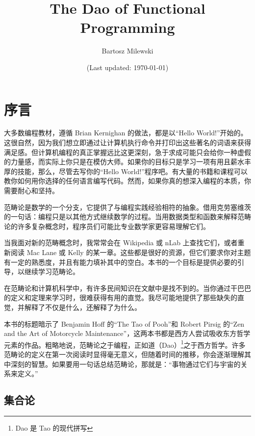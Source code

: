 \documentclass[11pt, book]{memoir}
\begin{document}
  \setcounter{tocdepth}{4}
  \setcounter{secnumdepth}{4}
  \frontmatter

  \title{\huge The Dao of Functional Programming}
  \author{\Large Bartosz Milewski }

  \date{\vfill (Last updated: \today)}

  \maketitle

  \tableofcontents

  \clearpage

  \section{序言}

  大多数编程教材，遵循 Brian Kernighan 的做法，都是以``Hello World!''开始的。这很自然，因为我们想立即通过让计算机执行命令并打印出这些著名的词语来获得满足感。但计算机编程的真正掌握远比这更深刻，急于求成可能只会给你一种虚假的力量感，而实际上你只是在模仿大师。如果你的目标只是学习一项有用且薪水丰厚的技能，那么，尽管去写你的``Hello World!''程序吧。有大量的书籍和课程可以教你如何用你选择的任何语言编写代码。然而，如果你真的想深入编程的本质，你需要耐心和坚持。

  范畴论是数学的一个分支，它提供了与编程实践经验相符的抽象。借用克劳塞维茨的一句话：编程只是以其他方式继续数学的过程。当用数据类型和函数来解释范畴论的许多复杂概念时，程序员们可能比专业数学家更容易理解它们。

  当我面对新的范畴概念时，我常常会在 Wikipedia 或 nLab 上查找它们，或者重新阅读 Mac Lane 或 Kelly 的某一章。这些都是很好的资源，但它们要求你对主题有一定的熟悉度，并且有能力填补其中的空白。本书的一个目标是提供必要的引导，以继续学习范畴论。

  在范畴论和计算机科学中，有许多民间知识在文献中是找不到的。当你通过干巴巴的定义和定理来学习时，很难获得有用的直觉。我尽可能地提供了那些缺失的直觉，并解释了不仅是什么，还解释了为什么。

  本书的标题暗示了 Benjamin Hoff 的``The Tao of Pooh''和 Robert Pirsig 的``Zen and the Art of Motorcycle Maintenance''，这两本书都是西方人尝试吸收东方哲学元素的作品。粗略地说，范畴论之于编程，正如道（Dao）\footnote{Dao 是 Tao 的现代拼写}之于西方哲学。许多范畴论的定义在第一次阅读时显得毫无意义，但随着时间的推移，你会逐渐理解其中深刻的智慧。如果要用一句话总结范畴论，那就是：``事物通过它们与宇宙的关系来定义。''

  \subsection{集合论}
\end{document}
